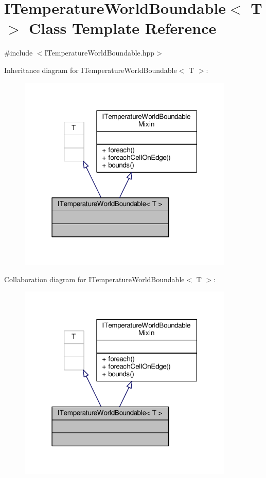 \hypertarget{class_i_temperature_world_boundable}{\section{I\-Temperature\-World\-Boundable$<$ T $>$ Class Template Reference}
\label{class_i_temperature_world_boundable}
}


{\ttfamily \#include $<$I\-Temperature\-World\-Boundable.\-hpp$>$}



Inheritance diagram for I\-Temperature\-World\-Boundable$<$ T $>$\-:
\nopagebreak
\begin{figure}[H]
\begin{center}
\leavevmode
\includegraphics[width=291pt]{class_i_temperature_world_boundable__inherit__graph}
\end{center}
\end{figure}


Collaboration diagram for I\-Temperature\-World\-Boundable$<$ T $>$\-:
\nopagebreak
\begin{figure}[H]
\begin{center}
\leavevmode
\includegraphics[width=291pt]{class_i_temperature_world_boundable__coll__graph}
\end{center}
\end{figure}
